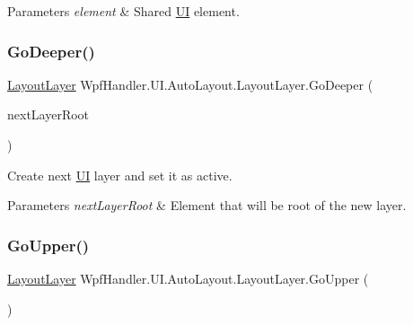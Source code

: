 \begin{DoxyParams}{Parameters}
{\em element} & Shared \mbox{\hyperlink{namespace_wpf_handler_1_1_u_i}{UI}} element.\\
\hline
\end{DoxyParams}
\mbox{\label{class_wpf_handler_1_1_u_i_1_1_auto_layout_1_1_layout_layer_aaca617fe1447981b657c49376b31ab81}} 
\subsubsection{\texorpdfstring{Go\+Deeper()}{GoDeeper()}}
{\footnotesize\ttfamily \mbox{\hyperlink{class_wpf_handler_1_1_u_i_1_1_auto_layout_1_1_layout_layer}{Layout\+Layer}} Wpf\+Handler.\+U\+I.\+Auto\+Layout.\+Layout\+Layer.\+Go\+Deeper (\begin{DoxyParamCaption}\item[{I\+Add\+Child}]{next\+Layer\+Root }\end{DoxyParamCaption})}



Create next \mbox{\hyperlink{namespace_wpf_handler_1_1_u_i}{UI}} layer and set it as active. 


\begin{DoxyParams}{Parameters}
{\em next\+Layer\+Root} & Element that will be root of the new layer.\\
\hline
\end{DoxyParams}
\mbox{\label{class_wpf_handler_1_1_u_i_1_1_auto_layout_1_1_layout_layer_a537da237144a99cdb6434db5363c668f}} 
\subsubsection{\texorpdfstring{Go\+Upper()}{GoUpper()}}
{\footnotesize\ttfamily \mbox{\hyperlink{class_wpf_handler_1_1_u_i_1_1_auto_layout_1_1_layout_layer}{Layout\+Layer}} Wpf\+Handler.\+U\+I.\+Auto\+Layout.\+Layout\+Layer.\+Go\+Upper (\begin{DoxyParamCaption}{ }\end{DoxyParamCaption})}



